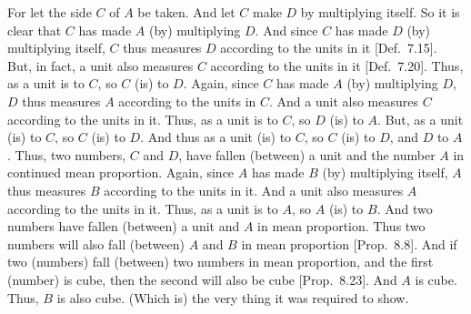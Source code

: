 \begin{Parallel}{}{}
{For let the side $C$ of $A$ be taken. And let $C$ make
$D$ by multiplying itself. So it is clear that $C$ has made $A$ (by)
multiplying $D$. And since $C$ has made $D$ (by) multiplying itself,
$C$ thus measures $D$ according to the units in it [Def.~7.15]. But, in fact, a unit also measures
$C$ according to the units in it [Def.~7.20]. 
Thus, as a unit is to $C$, so $C$ (is) to $D$. Again, since $C$ has
made $A$ (by) multiplying $D$, $D$ thus measures $A$ according to
the units in $C$. And a unit also measures $C$ according to the units in it. Thus, as a unit is to $C$, so $D$ (is) to $A$. But, as a unit (is) to $C$, so
$C$ (is) to $D$. And thus as a unit (is) to $C$, so $C$ (is) to $D$, and
$D$ to $A$. Thus, two numbers, $C$ and $D$, have fallen (between) a unit
and the number $A$ in continued  mean proportion. Again, since $A$ has made $B$ (by) multiplying itself, $A$ thus measures $B$ according to the units in it.
And a unit also measures $A$ according to the units in it. Thus, as a
unit is to $A$, so $A$ (is) to $B$. And two numbers have
fallen (between) a unit and $A$ in mean proportion. Thus two
numbers will also fall (between) $A$ and $B$ in mean proportion [Prop.~8.8].
And if two
(numbers) fall (between) two numbers in mean proportion, and the
first (number) is cube, then the second will also be  cube 
[Prop.~8.23]. And $A$ is cube.
Thus, $B$ is also  cube. (Which is) the very thing it was required to show.}
\end{Parallel}


